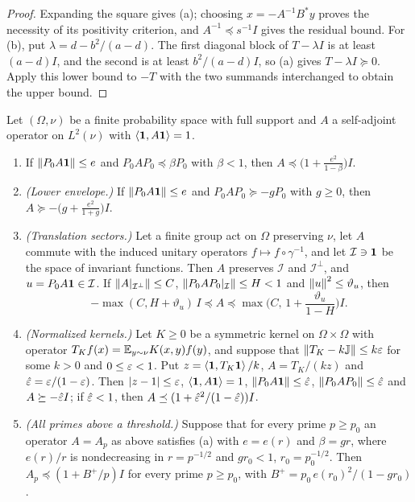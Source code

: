 \begin{proof}
Expanding the square gives (a); choosing $x=-A^{-1}B^*y$ proves the
necessity of its positivity criterion, and $A^{-1}\preceq s^{-1}I$ gives
the residual bound. For (b), put $\lambda=d-b^2/(a-d)$. The first diagonal
block of $T-\lambda I$ is at least $(a-d)I$, and the second is at least
$b^2/(a-d)I$, so (a) gives $T-\lambda I\succeq0$.
Apply this lower bound to $-T$ with the two summands interchanged to obtain
the upper bound.
\end{proof}

\begin{proposition}\label{prop:matching:positive}
Let $(\Omega,\nu)$ be a finite probability space with full support and $A$ a
self-adjoint operator on $L^2(\nu)$ with $\left\langle \mathbf 1,A\mathbf 1\right\rangle=1$.
\begin{enumerate}[label=\textup{(\alph*)}]
\item If $\left\|P_0A\mathbf 1\right\|\le e$ and $P_0AP_0\preceq\beta P_0$ with $\beta<1$,
  then $A\preceq\big(1+\frac{e^2}{1-\beta}\big)I$.
\item[\textup{(a$'$)}] \emph{(Lower envelope.)} If $\left\|P_0A\mathbf 1\right\|\le e$ and
  $P_0AP_0\succeq-gP_0$ with $g\ge0$, then
  $A\succeq-\big(g+\frac{e^2}{1+g}\big)I$.
\item[\textup{(a$''$)}] \emph{(Translation sectors.)} Let a finite group act on
  $\Omega$ preserving $\nu$, let $A$ commute with the induced unitary operators
  $f\mapsto f\circ\gamma^{-1}$, and let $\mathcal I\ni\mathbf 1$ be the space of
  invariant functions. Then $A$ preserves $\mathcal I$ and $\mathcal I^\perp$,
  and $u=P_0A\mathbf 1\in\mathcal I$. If $\left\|A|_{\mathcal I^\perp}\right\|\le C$,
  $\left\|P_0AP_0|_{\mathcal I}\right\|\le H<1$ and $\left\|u\right\|^2\le\vartheta_u$, then
  \[
    -\max(C,H+\vartheta_u)\,I\preceq A\preceq\max\Big(C,\,1+\frac{\vartheta_u}{1-H}\Big)I .
  \]
\item[\textup{(b)}] \emph{(Normalized kernels.)} Let $K\ge0$ be a symmetric kernel on
  $\Omega\times\Omega$ with operator $T_Kf(x)=\mathbb E_{y\sim\nu}K(x,y)f(y)$, and
  suppose that $\left\|T_K-k\mathbb J\right\|\le k\varepsilon$ for some $k>0$ and $0\le\varepsilon<1$. Put
  $z=\left\langle \mathbf 1,T_K\mathbf 1\right\rangle/k$, $A=T_K/(kz)$ and $\hat{\varepsilon}=\varepsilon/(1-\varepsilon)$. Then
  $|z-1|\le\varepsilon$, $\left\langle \mathbf 1,A\mathbf 1\right\rangle=1$, $\left\|P_0A\mathbf 1\right\|\le\hat{\varepsilon}$,
  $\left\|P_0AP_0\right\|\le\hat{\varepsilon}$ and $A\succeq-\hat{\varepsilon} I$; if $\hat{\varepsilon}<1$, then
  $A\preceq(1+\hat{\varepsilon}^2/(1-\hat{\varepsilon}))I$.
\item[\textup{(c)}] \emph{(All primes above a threshold.)} Suppose that for every prime
  $p\ge p_0$ an operator $A=A_p$ as above satisfies (a) with $e=e(r)$ and
  $\beta=gr$, where $e(r)/r$ is nondecreasing in $r=p^{-1/2}$ and $gr_0<1$,
  $r_0=p_0^{-1/2}$. Then $A_p\preceq(1+B^+/p)I$ for every prime $p\ge p_0$,
  with $B^+=p_0\,e(r_0)^2/(1-gr_0)$.
\end{enumerate}
\end{proposition}

